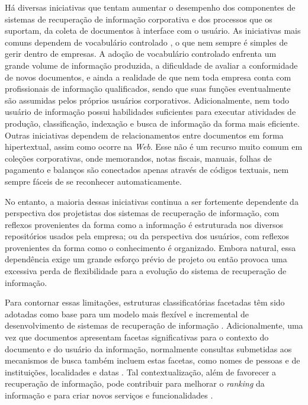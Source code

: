 Há diversas iniciativas que tentam aumentar o desempenho dos componentes de sistemas de recuperação de informação corporativa e dos processos que os suportam, da coleta de documentos à interface com o usuário. As iniciativas mais comuns dependem de vocabulário controlado \cite{ontology12}, o que nem sempre é simples de gerir dentro de empresas. A adoção de vocabulário controlado enfrenta um grande volume de informação produzida, a dificuldade de avaliar a conformidade de novos documentos, e ainda a realidade de que nem toda empresa conta com profissionais de informação qualificados, sendo que suas funções eventualmente são assumidas pelos próprios usuários corporativos. Adicionalmente, nem todo usuário de informação possui habilidades suficientes para executar atividades de produção, classificação, indexação e busca de informação da forma mais eficiente.
Outras iniciativas dependem de relacionamentos entre documentos em forma hipertextual, assim como ocorre na \textit{Web}. Esse não é um recurso muito comum em coleções corporativas, onde memorandos, notas fiscais, manuais, folhas de pagamento e balanços são conectados apenas através de códigos textuais, nem sempre fáceis de se reconhecer automaticamente.

No entanto, a maioria dessas iniciativas continua a ser fortemente dependente da perspectiva dos projetistas dos sistemas de recuperação de informação, com reflexos provenientes da forma como a informação é estruturada nos diversos repositórios usados pela empresa; ou da perspectiva dos usuários, com reflexos provenientes da forma como o conhecimento é organizado. Embora natural, essa dependência exige um grande esforço prévio de projeto ou então provoca uma excessiva perda de flexibilidade para a evolução do sistema de recuperação de informação. 

Para contornar essas limitações, estruturas classificatórias facetadas têm sido adotadas como base para um modelo mais flexível e incremental de desenvolvimento de sistemas de recuperação de informação \cite{broughton2006,docubrowse10}. Adicionalmente, uma vez que documentos apresentam facetas significativas para o contexto do documento e do usuário da informação, normalmente consultas submetidas aos mecanismos de busca também incluem estas facetas, como nomes de pessoas e de instituições, localidades e datas \cite{rosieJones08,docubrowse10,mir2ed}. Tal contextualização, além de favorecer a recuperação de informação, pode contribuir para melhorar o \textit{ranking} da informação e para criar novos serviços e funcionalidades \cite{borges07}.

